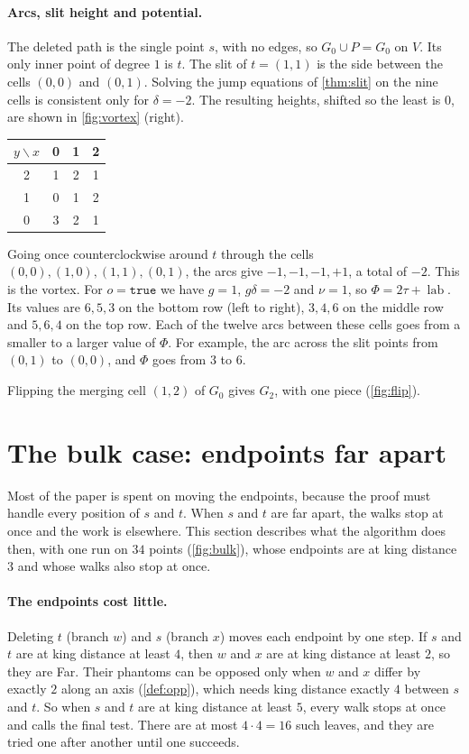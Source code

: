 \documentclass[11pt]{article}
\theoremstyle{plain}
\theoremstyle{definition}
\theoremstyle{remark}
\newcommand{\lean}[1]{\texttt{#1}}
\newcommand{\lab}{\operatorname{lab}}
\begin{document}
\paragraph{Arcs, slit height and potential.}
The deleted path is the single point $s$, with no edges, so $G_0\cup P=G_0$ on $V$.
Its only inner point of degree $1$ is $t$.
The slit of $t=(1,1)$ is the side between the cells $(0,0)$ and $(0,1)$.
Solving the jump equations of \cref{thm:slit} on the nine cells is consistent only for $\delta=-2$.
The resulting heights, shifted so the least is $0$, are shown in \cref{fig:vortex} (right).
\begin{center}
\begin{tabular}{@{}c|ccc@{}}
$y\backslash x$ & 0 & 1 & 2\\\hline
2 & 1 & 2 & 1\\
1 & 0 & 1 & 2\\
0 & 3 & 2 & 1
\end{tabular}
\end{center}
Going once counterclockwise around $t$ through the cells $(0,0),(1,0),(1,1),(0,1)$, the arcs give
$-1,-1,-1,+1$, a total of $-2$.
This is the vortex.
For $o=\lean{true}$ we have $g=1$, $g\delta=-2$ and $\nu=1$, so $\Phi=2\tau+\lab$.
Its values are $6,5,3$ on the bottom row (left to right), $3,4,6$ on the middle row and $5,6,4$ on
the top row.
Each of the twelve arcs between these cells goes from a smaller to a larger value of $\Phi$.
For example, the arc across the slit points from $(0,1)$ to $(0,0)$, and $\Phi$ goes from $3$ to $6$.

Flipping the merging cell $(1,2)$ of $G_0$ gives $G_2$, with one piece (\cref{fig:flip}).

\section{The bulk case: endpoints far apart}
\label{sec:bulk}

Most of the paper is spent on moving the endpoints, because the proof must handle every position of
$s$ and $t$.
When $s$ and $t$ are far apart, the walks stop at once and the work is elsewhere.
This section describes what the algorithm does then, with one run on $34$ points
(\cref{fig:bulk}), whose endpoints are at king distance $3$ and whose walks also stop at once.

\paragraph{The endpoints cost little.}
Deleting $t$ (branch $w$) and $s$ (branch $x$) moves each endpoint by one step.
If $s$ and $t$ are at king distance at least $4$, then $w$ and $x$ are at king distance at least
$2$, so they are Far.
Their phantoms can be opposed only when $w$ and $x$ differ by exactly $2$ along an axis
(\cref{def:opp}), which needs king distance exactly $4$ between $s$ and $t$.
So when $s$ and $t$ are at king distance at least $5$, every walk stops at once and calls the final
test.
There are at most $4\cdot4=16$ such leaves, and they are tried one after another until one
succeeds.
\end{document}
